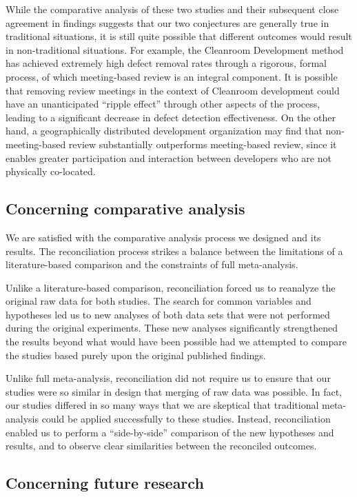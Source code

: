 While the comparative analysis of these two studies and their subsequent
close agreement in findings suggests that our two conjectures are generally
true in traditional situations, it is still quite possible that different
outcomes would result in non-traditional situations.  For example, the 
Cleanroom Development method has achieved extremely high defect removal 
rates through a rigorous, formal process, of which meeting-based review is an
integral component. It is possible that removing review meetings in the
context of Cleanroom development could have an unanticipated ``ripple
effect'' through other aspects of the process, leading to a significant
decrease in defect detection effectiveness. On the other hand, a
geographically distributed development organization may find that
non-meeting-based review substantially outperforms meeting-based review,
since it enables greater participation and interaction between developers
who are not physically co-located.

\subsection{Concerning comparative analysis}

We are satisfied with the comparative analysis process we designed
and its results.  The reconciliation process strikes a balance
between the limitations of a literature-based comparison and the
constraints of full meta-analysis.  

Unlike a literature-based comparison, reconciliation forced us to reanalyze
the original raw data for both studies. The search for common variables and
hypotheses led us to new analyses of both data sets that were not 
performed during the original experiments.  These new analyses
significantly strengthened the results beyond what would have been possible
had we attempted to compare the studies based purely upon the original
published findings.

Unlike full meta-analysis, reconciliation did not require us to ensure that
our studies were so similar in design that merging of raw data was
possible. In fact, our studies differed in so many ways that we are
skeptical that traditional meta-analysis could be applied successfully to these
studies.  Instead, reconciliation enabled us to perform a ``side-by-side''
comparison of the new hypotheses and results, and to observe clear
similarities between the reconciled outcomes. 

\subsection{Concerning future research}

